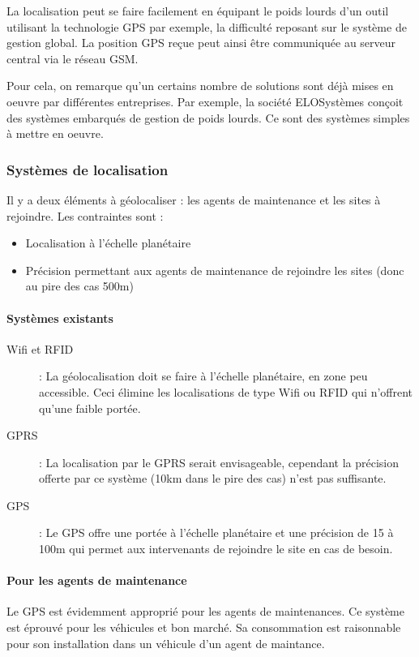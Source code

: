 \documentclass{article}
\begin{document}
La localisation peut se faire facilement en équipant le poids lourds
d’un outil utilisant la technologie GPS par exemple, la difficulté
reposant sur le système de gestion global. La position GPS reçue peut
ainsi être communiquée au serveur central via le réseau GSM. 

Pour cela, on remarque qu’un certains nombre de solutions sont déjà
mises en oeuvre par différentes entreprises. Par exemple, la société
ELOSystèmes conçoit des systèmes embarqués de gestion de poids lourds.
Ce sont des systèmes simples à mettre en oeuvre.

\subsubsection{Systèmes de localisation}
Il y a deux éléments à géolocaliser : les agents de maintenance et les
sites à rejoindre. Les contraintes sont :

\begin{itemize}
\item Localisation à l’échelle planétaire
\item Précision permettant aux agents de maintenance de rejoindre les
sites (donc au pire des cas 500m)
\end{itemize}
\paragraph{Systèmes existants}
\begin{description}
\item[Wifi et RFID] : La géolocalisation doit se faire à l’échelle
planétaire, en zone peu accessible. Ceci élimine les localisations de
type Wifi ou RFID qui n’offrent qu’une faible portée.
\item[GPRS] : La localisation par le GPRS serait envisageable, cependant
la précision offerte par ce système (10km dans le pire des cas) n’est
pas suffisante.
\item[GPS] : Le GPS offre une portée à l’échelle planétaire et une
précision de 15 à 100m qui permet aux intervenants de rejoindre le site
en cas de besoin.
\end{description}
\paragraph{Pour les agents de
maintenance}
Le GPS est évidemment approprié pour les agents de maintenances. Ce
système est éprouvé pour les véhicules et bon marché. Sa consommation
est raisonnable pour son installation dans un véhicule d’un agent de
maintance.
\end{document}
